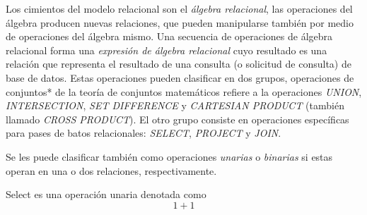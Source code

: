 Los cimientos del modelo relacional son el \emph{álgebra relacional}, las operaciones del álgebra producen nuevas relaciones, que pueden manipularse también por medio de operaciones del álgebra mismo. Una secuencia de operaciones de álgebra relacional forma una \emph{expresión de álgebra relacional} cuyo resultado es una relación que representa el resultado de una consulta (o solicitud de consulta) de base de datos. Estas operaciones pueden clasificar en dos grupos, operaciones de conjuntos* de la teoría de conjuntos matemáticos refiere a la operaciones \emph{UNION}, \emph{INTERSECTION}, \emph{SET DIFFERENCE} y \emph{CARTESIAN PRODUCT} (también llamado \emph{CROSS PRODUCT}). El otro grupo consiste en operaciones específicas para pases de batos relacionales: \emph{SELECT}, \emph{PROJECT} y \emph{JOIN}.

Se les puede clasificar también como operaciones \emph{unarias} o \emph{binarias} si estas operan en una o dos relaciones, respectivamente.

Select es una operación unaria denotada como
\begin{equation}
1+1
\end{equation}